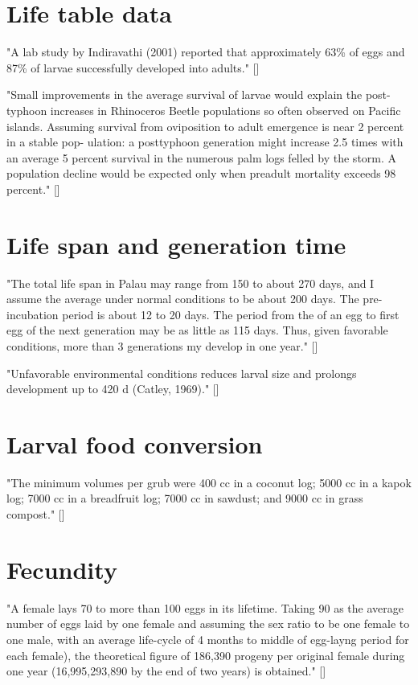 \documentclass[12pt,letterpaper,english,bibliography=totocnumbered, abstract=on]{scrartcl}
\begin{document}
\section{Life table data}

"A lab study by Indiravathi (2001) reported that approximately 63\% of eggs and 87\% of larvae successfully developed into adults." [\cite{pallipparambil_new_2015}]

"Small improvements in the average survival of
larvae would explain the post-typhoon increases in
Rhinoceros Beetle populations so often observed on
Pacific islands. Assuming survival from oviposition
to adult emergence is near 2 percent in a stable pop-
ulation: a posttyphoon generation might increase
2.5 times with an average 5 percent survival in
the numerous palm logs felled by the storm. A
population decline would be expected only when
preadult mortality exceeds 98 percent." [\cite{hinckley_ecology_1973}]

\section{Life span and generation time}

"The total life span in Palau may range from 150 to about 270 days, and I assume the average under normal conditions to be about 200 days. The pre-incubation period is about 12 to 20 days. The period from the of an egg to first egg of the next generation may be as little as 115 days. Thus, given favorable conditions, more than 3 generations my develop in one year." [\cite{gressitt_coconut_1953}]

"Unfavorable environmental conditions reduces larval size and prolongs
development up to 420 d (Catley, 1969)." [\cite{pallipparambil_new_2015}]

\section{Larval food conversion}

"The minimum volumes per grub were 400 cc in a coconut log; 5000 cc in a kapok log; 7000 cc in a breadfruit log; 7000 cc in sawdust; and 9000 cc in grass compost." [\cite{hinckley_ecology_1973}]
\section{Fecundity}

"A female lays 70 to more than 100 eggs in its lifetime. Taking 90 as the average number of eggs laid by one female and assuming the sex ratio to be one female to one male, with an average life-cycle of 4 months to middle of egg-layng period for each female), the theoretical figure of 186,390 progeny per original female during one year (16,995,293,890 by the end of two years) is obtained." [\cite{gressitt_coconut_1953}]
\end{document}
